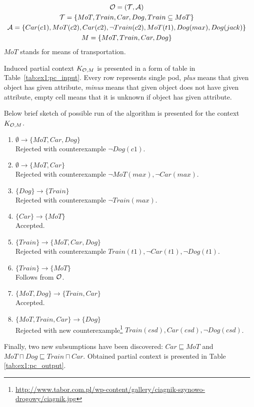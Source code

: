 \documentclass{llncs}
\newcommand{\ont}{\ensuremath\mathcal{O}}
\newcommand{\tbox}{\ensuremath\mathcal{T}}
\newcommand{\abox}{\ensuremath\mathcal{A}}
\begin{document}
\begin{example}
\begin{gather*}
\ont=(\tbox,\abox) \\
\tbox=\{MoT, Train, Car, Dog, Train\subseteq MoT\} \\
\abox=\{Car(c1), MoT(c2), Car(c2), \lnot Train(c2), MoT(t1), Dog(max), Dog(jack)\} \\
M=\{MoT, Train, Car, Dog\}
\end{gather*}
$MoT$ stands for means of transportation.

Induced partial context $K_{\ont,M}$ is presented in a form of table in Table~\ref{tab:ex1:pc_input}.
Every row represents single pod, \emph{plus} means that given object has given attribute, \emph{minus} means that given object does not have given attribute, empty cell means that it is unknown if object has given attribute.

Below brief sketch of possible run of the algorithm is presented for the context $K_{\ont,M}$.
\begin{enumerate}
\item $\emptyset \to \{MoT , Car , Dog\}$\\
Rejected with counterexample $\lnot Dog(c1)$.
\item $\emptyset \to \{MoT , Car\}$\\
Rejected with counterexample $\lnot MoT(max), \lnot Car(max)$.
\item $\{Dog\} \to \{Train\}$\\
Rejected with counterexample $\lnot Train(max)$.
\item $\{Car\} \to \{MoT\}$\\
Accepted.
\item $\{Train\} \to \{MoT, Car, Dog\}$\\
Rejected with counterexample $Train(t1), \lnot Car(t1), \lnot Dog(t1)$.
\item $\{Train\} \to \{MoT\}$\\
Follows from $\ont$.
\item $\{MoT, Dog\} \to \{Train, Car\}$\\
Accepted.
\item $\{MoT, Train, Car\} \to \{Dog\}$\\
Rejected with new counterexample\footnote{\url{http://www.tabor.com.pl/wp-content/gallery/ciagnik-szynowo-drogowy/ciagnik.jpg}} $Train(csd), Car(csd), \lnot Dog(csd)$.
\end{enumerate}

Finally, two new subsumptions have been discovered: $Car \sqsubseteq MoT$ and $MoT \sqcap Dog \sqsubseteq Train \sqcap Car$. Obtained partial context is presented in Table \ref{tab:ex1:pc_output}.

\end{example}
\end{document}
